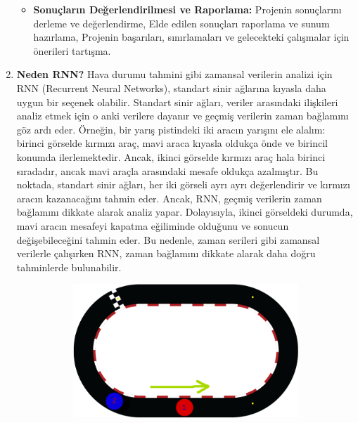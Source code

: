 \documentclass[12pt,a4paper]{article}
\begin{document}
\begin{enumerate}
\begin{itemize}
      \item {\bf\fontsize{12pt}{14pt}\selectfont Sonuçların Değerlendirilmesi ve Raporlama:}  
      Projenin sonuçlarını derleme ve değerlendirme,
Elde edilen sonuçları raporlama ve sunum hazırlama,
Projenin başarıları, sınırlamaları ve gelecekteki çalışmalar için önerileri tartışma.
  \end{itemize}
 \newpage
\item  {\bf\fontsize{12pt}{14pt}\selectfont Neden RNN?}\newline\newline
	Hava durumu tahmini gibi zamansal verilerin analizi için RNN (Recurrent Neural Networks), standart sinir ağlarına kıyasla daha uygun bir seçenek olabilir. Standart sinir ağları, veriler arasındaki ilişkileri analiz etmek için o anki verilere dayanır ve geçmiş verilerin zaman bağlamını göz ardı eder. Örneğin, bir yarış pistindeki iki aracın yarışını ele alalım: birinci görselde kırmızı araç, mavi araca kıyasla oldukça önde ve birincil konumda ilerlemektedir. Ancak, ikinci görselde kırmızı araç hala birinci sıradadır, ancak mavi araçla arasındaki mesafe oldukça azalmıştır. Bu noktada, standart sinir ağları, her iki görseli ayrı ayrı değerlendirir ve kırmızı aracın kazanacağını tahmin eder. Ancak, RNN, geçmiş verilerin zaman bağlamını dikkate alarak analiz yapar. Dolayısıyla, ikinci görseldeki durumda, mavi aracın mesafeyi kapatma eğiliminde olduğunu ve sonucun değişebileceğini tahmin eder. Bu nedenle, zaman serileri gibi zamansal verilerle çalışırken RNN, zaman bağlamını dikkate alarak daha doğru tahminlerde bulunabilir\cite{deep_learning_turkiye}. \newline\newline
 \begin{figure}[htbp]
    \centering
    \begin{subfigure}[b]{0.45\textwidth}
        \centering
        \includegraphics[width=\textwidth]{pist alanı.png}

\end{subfigure}
\end{figure}
\end{enumerate}
\end{document}
